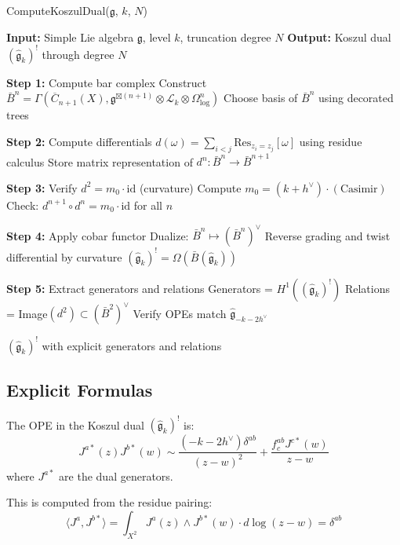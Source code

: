 \begin{algorithm}[H]
\caption{ComputeKoszulDual($\mathfrak{g}$, $k$, $N$)}
\begin{algorithmic}[1]
\State \textbf{Input:} Simple Lie algebra $\mathfrak{g}$, level $k$, truncation degree $N$
\State \textbf{Output:} Koszul dual $(\widehat{\mathfrak{g}}_k)^!$ through degree $N$

\State
\State \textbf{Step 1:} Compute bar complex
    \State Construct $\bar{B}^n = \Gamma(\overline{C}_{n+1}(X), \mathfrak{g}^{\boxtimes(n+1)} \otimes \mathcal{L}_k \otimes \Omega^n_{\log})$
    \State Choose basis of $\bar{B}^n$ using decorated trees
\EndFor

\State
\State \textbf{Step 2:} Compute differentials
        \State $d(\omega) = \sum_{i<j} \mathrm{Res}_{z_i=z_j}[\omega]$ using residue calculus
        \State Store matrix representation of $d^n: \bar{B}^n \to \bar{B}^{n+1}$
    \EndFor
\EndFor

\State
\State \textbf{Step 3:} Verify $d^2 = m_0 \cdot \mathrm{id}$ (curvature)
\State Compute $m_0 = (k+h^\vee) \cdot (\text{Casimir})$
\State Check: $d^{n+1} \circ d^n = m_0 \cdot \mathrm{id}$ for all $n$

\State
\State \textbf{Step 4:} Apply cobar functor
\State Dualize: $\bar{B}^n \mapsto (\bar{B}^n)^\vee$
\State Reverse grading and twist differential by curvature
\State $(\widehat{\mathfrak{g}}_k)^! = \Omega(\bar{B}(\widehat{\mathfrak{g}}_k))$

\State
\State \textbf{Step 5:} Extract generators and relations
\State Generators = $H^1((\widehat{\mathfrak{g}}_k)^!)$
\State Relations = Image$(d^2) \subset (\bar{B}^2)^\vee$
\State Verify OPEs match $\widehat{\mathfrak{g}}_{-k-2h^\vee}$

\State
\Return $(\widehat{\mathfrak{g}}_k)^!$ with explicit generators and relations
\end{algorithmic}
\end{algorithm}

\subsection{Explicit Formulas}

\begin{theorem}
The OPE in the Koszul dual $(\widehat{\mathfrak{g}}_k)^!$ is:
\begin{equation}
J^{a*}(z) J^{b*}(w) \sim \frac{(-k-2h^\vee) \delta^{ab}}{(z-w)^2} + \frac{f^{ab}_c J^{c*}(w)}{z-w}
\end{equation}
where $J^{a*}$ are the dual generators.

This is computed from the residue pairing:
\begin{equation}
\langle J^a, J^{b*} \rangle = \int_{X^2} J^a(z) \wedge J^{b*}(w) \cdot d\log(z-w) = \delta^{ab}
\end{equation}
\end{theorem}

